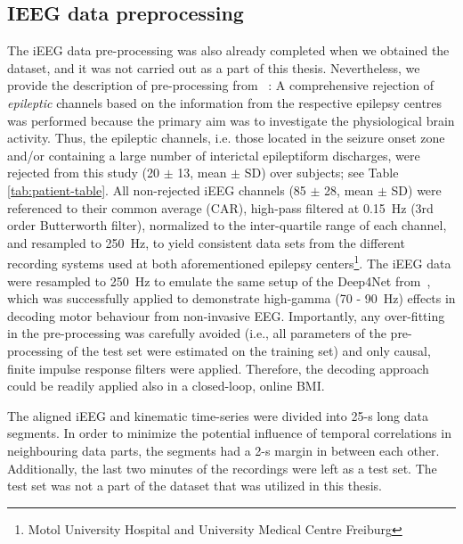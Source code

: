 \subsection{IEEG data preprocessing}\label{subsec:ieeg-data-preprocessing}
The iEEG data pre-processing was also already completed when we obtained the dataset, and it was not carried out as a part of this thesis.
Nevertheless, we provide the description of pre-processing from ~\cite{Hammer-2021}:
A comprehensive rejection of \textit{epileptic} channels based on the information from the respective epilepsy centres was performed because the primary aim was to investigate the physiological brain activity.
Thus, the epileptic channels, i.e. those located in the seizure onset zone and/or containing a large number of interictal epileptiform discharges, were rejected from this study (20 $\pm$ 13, mean $\pm$ SD) over subjects; see Table \ref{tab:patient-table}.
All non-rejected iEEG channels (85 $\pm$ 28, mean $\pm$ SD) were referenced to their common average (CAR), high-pass filtered at 0.15~Hz (3rd order Butterworth filter), normalized to the inter-quartile range of each channel, and resampled to 250~Hz, to yield consistent data sets from the different recording systems used at both aforementioned epilepsy centers\footnote{Motol University Hospital and University Medical Centre Freiburg}.
The iEEG data were resampled to 250~Hz to emulate the same setup of the Deep4Net from~\cite{schirrmeister-deep-2017}, which was successfully applied to demonstrate high-gamma (70 - 90~Hz) effects in decoding motor behaviour from non-invasive EEG. Importantly, any over-fitting in the pre-processing was carefully avoided (i.e., all parameters of the pre-processing of the test set were estimated on the training set) and only causal, finite impulse response filters were applied.
Therefore, the decoding approach could be readily applied also in a closed-loop, online BMI.

The aligned iEEG and kinematic time-series were divided into 25-s long data segments.
In order to minimize the potential influence of temporal correlations in neighbouring data parts, the segments had a 2-s margin in between each other.
Additionally, the last two minutes of the recordings were left as a test set.
The test set was not a part of the dataset that was utilized in this thesis.


